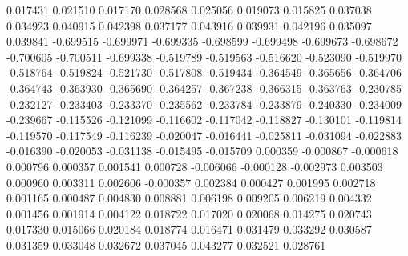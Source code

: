 0.017431
0.021510
0.017170
0.028568
0.025056
0.019073
0.015825
0.037038
0.034923
0.040915
0.042398
0.037177
0.043916
0.039931
0.042196
0.035097
0.039841
-0.699515
-0.699971
-0.699335
-0.698599
-0.699498
-0.699673
-0.698672
-0.700605
-0.700511
-0.699338
-0.519789
-0.519563
-0.516620
-0.523090
-0.519970
-0.518764
-0.519824
-0.521730
-0.517808
-0.519434
-0.364549
-0.365656
-0.364706
-0.364743
-0.363930
-0.365690
-0.364257
-0.367238
-0.366315
-0.363763
-0.230785
-0.232127
-0.233403
-0.233370
-0.235562
-0.233784
-0.233879
-0.240330
-0.234009
-0.239667
-0.115526
-0.121099
-0.116602
-0.117042
-0.118827
-0.130101
-0.119814
-0.119570
-0.117549
-0.116239
-0.020047
-0.016441
-0.025811
-0.031094
-0.022883
-0.016390
-0.020053
-0.031138
-0.015495
-0.015709
0.000359
-0.000867
-0.000618
0.000796
0.000357
0.001541
0.000728
-0.006066
-0.000128
-0.002973
0.003503
0.000960
0.003311
0.002606
-0.000357
0.002384
0.000427
0.001995
0.002718
0.001165
0.000487
0.004830
0.008881
0.006198
0.009205
0.006219
0.004332
0.001456
0.001914
0.004122
0.018722
0.017020
0.020068
0.014275
0.020743
0.017330
0.015066
0.020184
0.018774
0.016471
0.031479
0.033292
0.030587
0.031359
0.033048
0.032672
0.037045
0.043277
0.032521
0.028761
